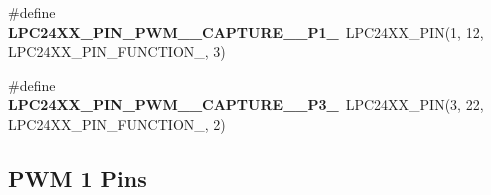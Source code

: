 \begin{DoxyCompactItemize}
\#define {\bfseries L\+P\+C24\+X\+X\+\_\+\+P\+I\+N\+\_\+\+P\+W\+M\+\_\+\_\+\+C\+A\+P\+T\+U\+R\+E\+\_\+\_\+\+P1\+\_}~L\+P\+C24\+X\+X\+\_\+\+P\+IN(1, 12, L\+P\+C24\+X\+X\+\_\+\+P\+I\+N\+\_\+\+F\+U\+N\+C\+T\+I\+O\+N\+\_, 3)
\item 
\mbox{\label{group__lpc24xx__io_ga0f93bb93331f8a1e1a70a3fc37f1b3d2}} 
\#define {\bfseries L\+P\+C24\+X\+X\+\_\+\+P\+I\+N\+\_\+\+P\+W\+M\+\_\+\_\+\+C\+A\+P\+T\+U\+R\+E\+\_\+\_\+\+P3\+\_}~L\+P\+C24\+X\+X\+\_\+\+P\+IN(3, 22, L\+P\+C24\+X\+X\+\_\+\+P\+I\+N\+\_\+\+F\+U\+N\+C\+T\+I\+O\+N\+\_, 2)
\end{DoxyCompactItemize}
\subsection*{P\+WM 1 Pins}
